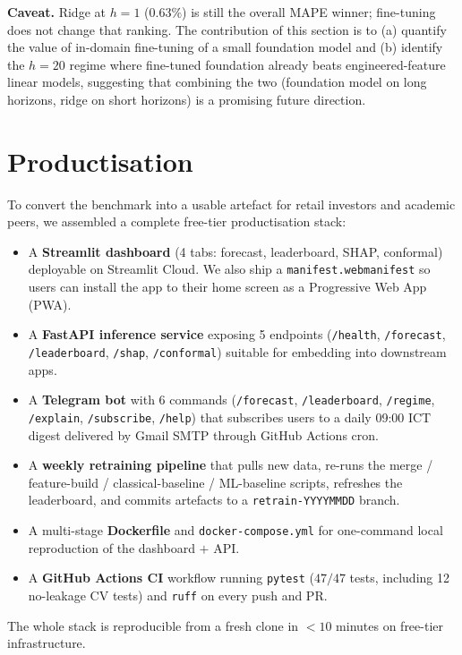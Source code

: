 \documentclass[conference]{IEEEtran}
\begin{document}
\textbf{Caveat.} Ridge at $h{=}1$ ($0.63\%$) is still the overall MAPE winner; fine-tuning does not change that ranking. The contribution of this section is to (a) quantify the value of in-domain fine-tuning of a small foundation model and (b) identify the $h{=}20$ regime where fine-tuned foundation already beats engineered-feature linear models, suggesting that combining the two (foundation model on long horizons, ridge on short horizons) is a promising future direction.

\section{Productisation}

To convert the benchmark into a usable artefact for retail investors and academic peers, we assembled a complete free-tier productisation stack:

\begin{itemize}
\item A \textbf{Streamlit dashboard} (4 tabs: forecast, leaderboard, SHAP, conformal) deployable on Streamlit Cloud. We also ship a \texttt{manifest.webmanifest} so users can install the app to their home screen as a Progressive Web App (PWA).
\item A \textbf{FastAPI inference service} exposing 5 endpoints (\texttt{/health}, \texttt{/forecast}, \texttt{/leaderboard}, \texttt{/shap}, \texttt{/conformal}) suitable for embedding into downstream apps.
\item A \textbf{Telegram bot} with 6 commands (\texttt{/forecast}, \texttt{/leaderboard}, \texttt{/regime}, \texttt{/explain}, \texttt{/subscribe}, \texttt{/help}) that subscribes users to a daily 09:00 ICT digest delivered by Gmail SMTP through GitHub Actions cron.
\item A \textbf{weekly retraining pipeline} that pulls new data, re-runs the merge / feature-build / classical-baseline / ML-baseline scripts, refreshes the leaderboard, and commits artefacts to a \texttt{retrain-YYYYMMDD} branch.
\item A multi-stage \textbf{Dockerfile} and \texttt{docker-compose.yml} for one-command local reproduction of the dashboard $+$ API.
\item A \textbf{GitHub Actions CI} workflow running \texttt{pytest} ($47/47$ tests, including 12 no-leakage CV tests) and \texttt{ruff} on every push and PR.
\end{itemize}

The whole stack is reproducible from a fresh clone in $<10$ minutes on free-tier infrastructure.
\end{document}
